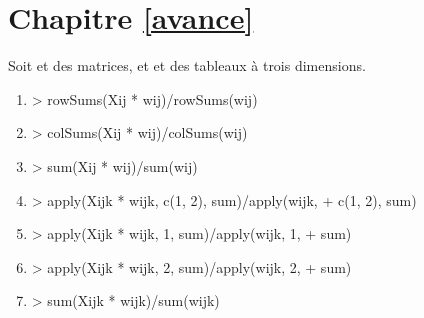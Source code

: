 \section*{Chapitre \ref{avance}}
\begin{reponse}{6.1}
    Soit  et  des matrices, et 
    et  des tableaux ^^e0 trois dimensions.
    \begin{enumerate}
\item
\begin{Schunk}
\begin{Sinput}
> rowSums(Xij * wij)/rowSums(wij)
\end{Sinput}
\end{Schunk}
\item
\begin{Schunk}
\begin{Sinput}
> colSums(Xij * wij)/colSums(wij)
\end{Sinput}
\end{Schunk}
\item
\begin{Schunk}
\begin{Sinput}
> sum(Xij * wij)/sum(wij)
\end{Sinput}
\end{Schunk}
\item
\begin{Schunk}
\begin{Sinput}
> apply(Xijk * wijk, c(1, 2), sum)/apply(wijk,
+     c(1, 2), sum)
\end{Sinput}
\end{Schunk}
\item
\begin{Schunk}
\begin{Sinput}
> apply(Xijk * wijk, 1, sum)/apply(wijk, 1,
+     sum)
\end{Sinput}
\end{Schunk}
\item
\begin{Schunk}
\begin{Sinput}
> apply(Xijk * wijk, 2, sum)/apply(wijk, 2,
+     sum)
\end{Sinput}
\end{Schunk}
\item
\begin{Schunk}
\begin{Sinput}
> sum(Xijk * wijk)/sum(wijk)
\end{Sinput}
\end{Schunk}
    \end{enumerate}
  
\end{reponse}
